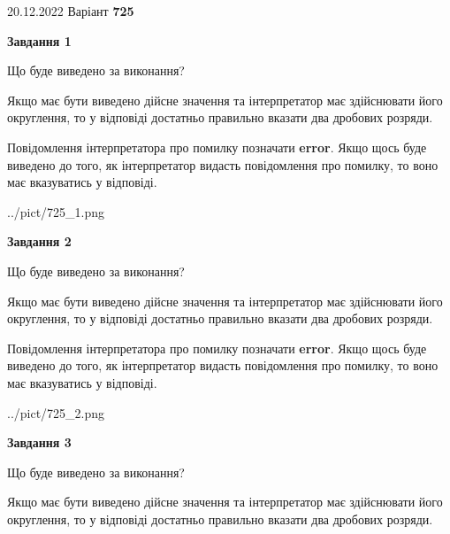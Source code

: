 \documentclass[12pt, ukrainian]{article}
\begin{document}
{20.12.2022 Варіант \No \textbf { 725 }\par}
{
\begin {Large}

{\begin {center}\textbf{Завдання 1}\end {center}}\par
Що буде виведено за виконання? \par

Якщо має бути виведено дійсне значення та інтерпретатор має здійснювати його округлення, 
то у відповіді достатньо правильно вказати два дробових розряди.

Повідомлення інтерпретатора про помилку позначати \textbf{error}.
Якщо щось буде виведено до того, як інтерпретатор видасть повідомлення про помилку, 
то воно має вказуватись у відповіді. \par

\begin{center}
	{../pict/725_1.png}
\end{center}
\newpage

{\begin {center}\textbf{Завдання 2}\end {center}}\par
Що буде виведено за виконання? \par

Якщо має бути виведено дійсне значення та інтерпретатор має здійснювати його округлення, 
то у відповіді достатньо правильно вказати два дробових розряди.

Повідомлення інтерпретатора про помилку позначати \textbf{error}.
Якщо щось буде виведено до того, як інтерпретатор видасть повідомлення про помилку, 
то воно має вказуватись у відповіді. \par

\begin{center}
	{../pict/725_2.png}
\end{center}
\newpage

{\begin {center}\textbf{Завдання 3}\end {center}}\par
Що буде виведено за виконання? \par

Якщо має бути виведено дійсне значення та інтерпретатор має здійснювати його округлення, 
то у відповіді достатньо правильно вказати два дробових розряди.


\end{Large}}
\end{document}
